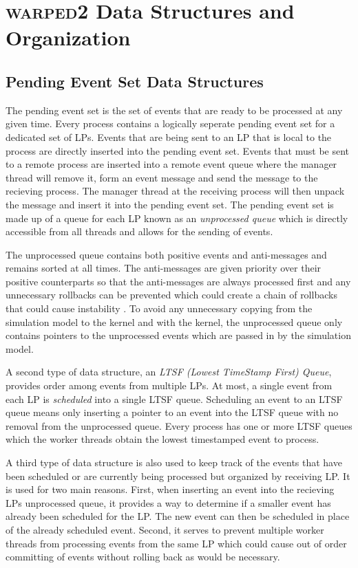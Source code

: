 \documentclass[11pt]{book}
\begin{document}
\chapter{\textsc{warped2} Data Structures and Organization}\label{warped2_ds}

\section{Pending Event Set Data Structures}

The pending event set is the set of events that are ready to be processed at any given time.
Every process contains a logically seperate pending event set for a dedicated set of LPs. Events
that are being sent to an LP that is local to the process are directly inserted into the pending
event set. Events that must be sent to a remote process are inserted into a remote event
queue where the manager thread will remove it, form an event message and send the message to
the recieving process. The manager thread at the receiving process will then unpack the message
and insert it into the pending event set. The pending event set is made up of a queue for each
LP known as an \emph{unprocessed queue} which is directly accessible from all threads and allows
for the sending of events.

The unprocessed queue contains both positive events and anti-messages and remains sorted at all
times. The anti-messages are given priority over their positive counterparts so that the
anti-messages are always processed first and any unnecessary rollbacks can be prevented which
could create a chain of rollbacks that could cause instability \cite{lubachevsky-89}. To avoid
any unnecessary copying from the simulation model to the kernel and with the kernel, the
unprocessed queue only contains pointers to the unprocessed events which are passed in by the
simulation model.

A second type of data structure, an \emph{LTSF (Lowest TimeStamp First) Queue}, provides
order among events from multiple LPs. At most, a single event from each LP is \emph{scheduled}
into a single LTSF queue. Scheduling an event to an LTSF queue means only inserting a pointer
to an event into the LTSF queue with no removal from the unprocessed queue. Every process has
one or more LTSF queues which the worker threads obtain the lowest timestamped event to process.

A third type of data structure is also used to keep track of the events that have been
scheduled or are currently being processed but organized by receiving LP. It is used for
two main reasons. First, when inserting an event into the recieving LPs unprocessed queue, it
provides a way to determine if a smaller event has already been scheduled for the LP. The new
event can then be scheduled in place of the already scheduled event. Second, it serves to
prevent multiple worker threads from processing events from the same LP which could cause
out of order committing of events without rolling back as would be necessary.
\end{document}
